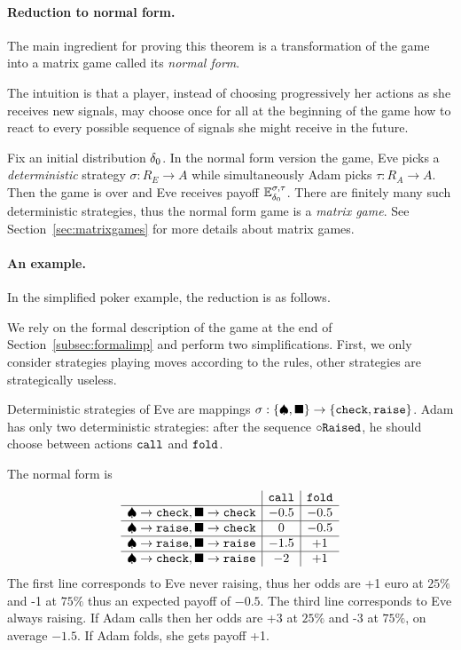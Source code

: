 \paragraph{Reduction to normal form.}
The main ingredient for proving this theorem is a transformation
of the game into a matrix game called its \emph{normal form}.

The intuition is that a player,
instead of choosing progressively her actions
as she receives new signals,
may choose once for all at the beginning of the game
how to react to every possible sequence of signals
she might receive in the future.

Fix an initial distribution $\delta_0$.
In the normal form version the game,
Eve  picks 
a \emph{deterministic} strategy
$\sigma : R_E \to A$
while simultaneously
Adam picks
$\tau : R_A \to A$.
Then the game is over
and Eve receives payoff
$\mathbb{E}_{\delta_0}^{\sigma,\tau}$.
There are finitely many such deterministic strategies,
thus the normal form game is a \emph{matrix game}.
See Section~\ref{sec:matrixgames} for more details
about matrix games.


\paragraph{An example.}
In the simplified poker example,
the reduction is as follows.

We rely on the formal description of the game 
at the end of Section~\ref{subsec:formalimp}
and perform two simplifications.
First, we only consider strategies playing moves according to the rules,
other strategies are strategically useless.


Deterministic strategies of Eve are
mappings $\sigma : \{\spadesuit,\blacksquare\}
\to\{ {\tt check},{\tt raise}\}$.
Adam has only two deterministic strategies:
after the sequence $\circ {\tt Raised}$,
he should choose between
actions ${\tt call}$ and ${\tt fold}$.

The normal form is
\[
\begin{array}{c|c|c}
&  {\tt call} &{\tt fold}\\
\hline
\spadesuit\to {\tt check},  \blacksquare\to {\tt check}
& -0.5 & -0.5\\
\hline
\spadesuit\to {\tt raise},  \blacksquare\to {\tt check}
& 0 & -0.5\\
\hline
\spadesuit\to {\tt raise},  \blacksquare\to {\tt raise}
& -1.5 & +1\\
\hline
\spadesuit\to {\tt check},  \blacksquare\to {\tt raise}
& -2 & +1\\
\end{array}
\]
The first line corresponds to Eve never raising,
thus her odds are +1 euro at $25\%$ 
and -1 at $75\%$ thus an expected payoff of
$-0.5$.
The third line corresponds to Eve always raising.
If Adam calls then her odds are +3 at $25\%$
and -3 at $75\%$, on average $-1.5$.
If Adam folds, she gets payoff +1.

